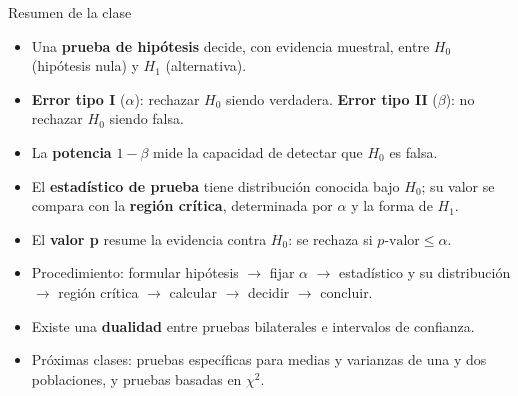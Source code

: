 \documentclass[aspectratio=169,11pt]{beamer}
\begin{document}
\begin{frame}{Resumen de la clase}
\begin{itemize}
\item Una \textbf{prueba de hipótesis} decide, con evidencia muestral, entre $H_0$ (hipótesis nula) y $H_1$ (alternativa).
\item \textbf{Error tipo I} ($\alpha$): rechazar $H_0$ siendo verdadera. \textbf{Error tipo II} ($\beta$): no rechazar $H_0$ siendo falsa.
\item La \textbf{potencia} $1-\beta$ mide la capacidad de detectar que $H_0$ es falsa.
\item El \textbf{estadístico de prueba} tiene distribución conocida bajo $H_0$; su valor se compara con la \textbf{región crítica}, determinada por $\alpha$ y la forma de $H_1$.
\item El \textbf{valor p} resume la evidencia contra $H_0$: se rechaza si $p\text{-valor}\le\alpha$.
\item Procedimiento: formular hipótesis $\to$ fijar $\alpha$ $\to$ estadístico y su distribución $\to$ región crítica $\to$ calcular $\to$ decidir $\to$ concluir.
\item Existe una \textbf{dualidad} entre pruebas bilaterales e intervalos de confianza.
\item Próximas clases: pruebas específicas para medias y varianzas de una y dos poblaciones, y pruebas basadas en $\chi^2$.
\end{itemize}
\end{frame}
\end{document}
